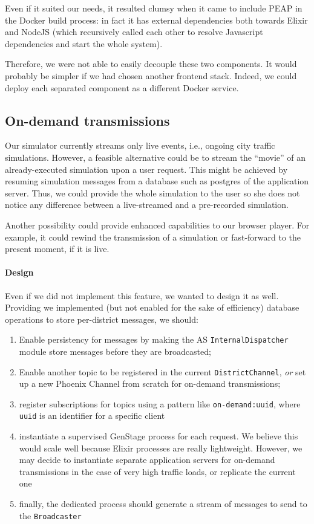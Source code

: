 Even if it suited our needs, it resulted clumsy when it came to include PEAP
in the Docker build process: in fact it has external dependencies both towards
Elixir and NodeJS (which recursively called each other to resolve
Javascript dependencies and start the whole system).

Therefore, we were not able to easily decouple these two components.
It would probably be simpler if we had chosen another
frontend stack. Indeed, we could 
deploy each separated component as a different Docker service.

\subsection{On-demand transmissions}
Our simulator currently streams only live events, i.e., ongoing city traffic
simulations. However, a feasible alternative could be to stream the ``movie''
of an already-executed simulation upon a user request.
This might be achieved by resuming simulation messages from a database such as
postgres of the application server. Thus, we could provide the
whole simulation to the user so she does not notice any difference between
a live-streamed and a pre-recorded simulation.

Another possibility could provide enhanced capabilities to our browser
player. For example, it could rewind the transmission of a simulation or
fast-forward to the present moment, if it is live.

\paragraph{Design}
Even if we did not implement this feature, we wanted to design it as well.
Providing we implemented (but not enabled for the sake of efficiency) database
operations to store per-district messages, we should:

\begin{enumerate}
  \item Enable persistency for messages by making the AS
    \texttt{InternalDispatcher} module store messages before they are
    broadcasted;
  \item Enable another topic to be registered in the current
    \texttt{DistrictChannel}, \textit{or} set up a new Phoenix Channel from
    scratch for on-demand transmissions;
  \item register subscriptions for topics using a pattern like
    \texttt{on-demand:uuid}, where \texttt{uuid} is an identifier for a
    specific client
  \item instantiate a supervised GenStage process for each request. We believe
    this would scale well because Elixir processes are really lightweight.
    However, we may decide to instantiate separate application servers for
    on-demand transmissions in the case of very high traffic loads, or
    replicate the current one
  \item finally, the dedicated process should generate a stream of messages to
    send to the \texttt{Broadcaster}
\end{enumerate}

